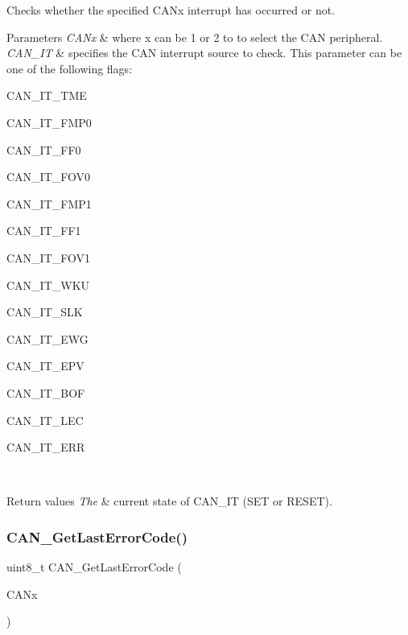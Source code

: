 Checks whether the specified C\+A\+Nx interrupt has occurred or not. 


\begin{DoxyParams}{Parameters}
{\em C\+A\+Nx} & where x can be 1 or 2 to to select the C\+AN peripheral. \\
\hline
{\em C\+A\+N\+\_\+\+IT} & specifies the C\+AN interrupt source to check. This parameter can be one of the following flags\+:
\begin{DoxyItemize}
\item C\+A\+N\+\_\+\+I\+T\+\_\+\+T\+ME
\item C\+A\+N\+\_\+\+I\+T\+\_\+\+F\+M\+P0
\item C\+A\+N\+\_\+\+I\+T\+\_\+\+F\+F0
\item C\+A\+N\+\_\+\+I\+T\+\_\+\+F\+O\+V0
\item C\+A\+N\+\_\+\+I\+T\+\_\+\+F\+M\+P1
\item C\+A\+N\+\_\+\+I\+T\+\_\+\+F\+F1
\item C\+A\+N\+\_\+\+I\+T\+\_\+\+F\+O\+V1
\item C\+A\+N\+\_\+\+I\+T\+\_\+\+W\+KU
\item C\+A\+N\+\_\+\+I\+T\+\_\+\+S\+LK
\item C\+A\+N\+\_\+\+I\+T\+\_\+\+E\+WG
\item C\+A\+N\+\_\+\+I\+T\+\_\+\+E\+PV
\item C\+A\+N\+\_\+\+I\+T\+\_\+\+B\+OF
\item C\+A\+N\+\_\+\+I\+T\+\_\+\+L\+EC
\item C\+A\+N\+\_\+\+I\+T\+\_\+\+E\+RR 
\end{DoxyItemize}\\
\hline
\end{DoxyParams}

\begin{DoxyRetVals}{Return values}
{\em The} & current state of C\+A\+N\+\_\+\+IT (S\+ET or R\+E\+S\+ET). \\
\hline
\end{DoxyRetVals}
\mbox{\label{group___c_a_n___private___functions_gaaee721a392b6b21bfd15dc160aeb6924}} 
\subsubsection{\texorpdfstring{CAN\_GetLastErrorCode()}{CAN\_GetLastErrorCode()}}
{\footnotesize\ttfamily uint8\+\_\+t C\+A\+N\+\_\+\+Get\+Last\+Error\+Code (\begin{DoxyParamCaption}\item[{\mbox{\hyperlink{struct_c_a_n___type_def}{C\+A\+N\+\_\+\+Type\+Def}} $\ast$}]{C\+A\+Nx }\end{DoxyParamCaption})}



